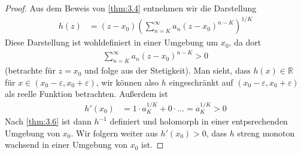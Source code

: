 \begin{theorem}[Satz]
\begin{proof}
    Aus dem Beweis von \ref{thm:3.4} entnehmen wir die Darstellung
    \begin{align*}
      h(z) &= (z-x_0) \left( \sum\limits_{n=K}^{\infty} a_n (z-x_0)^{n-K} \right)^{1/K} 
    \end{align*}
    Diese Darstellung ist wohldefiniert in einer Umgebung um $x_0$, da dort
    \begin{align*}
      \sum_{n=K}^\infty a_n (z-x_0)^{n-K} > 0
    \end{align*}
    (betrachte für $z=x_0$ und folge aus der Stetigkeit).
    Man sieht, dass $h(x) \in \mathbb{R}$ für $x \in (x_0 - \varepsilon, x_0 + \varepsilon)$, wir können also $h$ eingeschränkt auf $(x_0-\varepsilon, x_0+\varepsilon)$ als reelle Funktion betrachten.
    Außerdem ist
    \begin{align*}
      h'(x_0) &= 1 \cdot a_K^{1/K} + 0 \cdot \dotso = a_K^{1/K} > 0
    \end{align*}
    Nach \ref{thm:3.6} ist dann $h^{-1}$ definiert und holomorph in einer entpsrechenden Umgebung von $x_0$.
    Wir folgern weiter aus $h'(x_0) > 0$, dass $h$ streng monoton wachsend in einer Umgebung von $x_0$ ist.


\end{proof}
\end{theorem}
